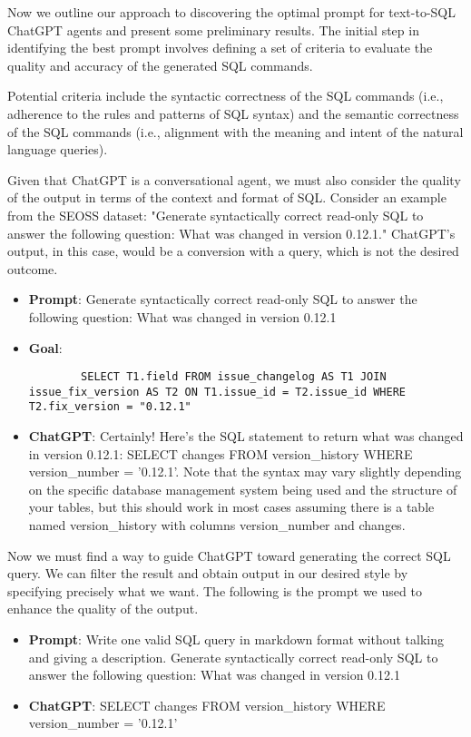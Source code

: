 Now we outline our approach to discovering the optimal prompt for text-to-SQL ChatGPT agents and present some preliminary results.
The initial step in identifying the best prompt involves defining a set of criteria to evaluate the quality and accuracy of the generated SQL commands.

Potential criteria include the syntactic correctness of the SQL commands (i.e., adherence to the rules and patterns of SQL syntax) and the semantic correctness of the SQL commands (i.e., alignment with the meaning and intent of the natural language queries).

Given that ChatGPT is a conversational agent, we must also consider the quality of the output in terms of the context and format of SQL.
Consider an example from the SEOSS dataset: "Generate syntactically correct read-only SQL to answer the following question: What was changed in version 0.12.1." ChatGPT's output, in this case, would be a conversion with a query, which is not the desired outcome.

\begin{itemize}
    \item \textbf{Prompt}: Generate syntactically correct read-only SQL to answer the following question: What was changed in version 0.12.1
    \item \textbf{Goal}: \\\begin{lstlisting}
        SELECT T1.field FROM issue_changelog AS T1 JOIN issue_fix_version AS T2 ON T1.issue_id = T2.issue_id WHERE T2.fix_version = "0.12.1"
    \end{lstlisting}
    \item \textbf{ChatGPT}: Certainly! Here's the SQL statement to return what was changed in version 0.12.1:
          SELECT changes FROM version\_history WHERE version\_number = '0.12.1'. Note that the syntax may vary slightly depending on the specific database management system being used and the structure of your tables, but this should work in most cases assuming there is a table named version\_history with columns version\_number and changes.
\end{itemize}

Now we must find a way to guide ChatGPT toward generating the correct SQL query. We can filter the result and obtain output in our desired style by specifying precisely what we want. The following is the prompt we used to enhance the quality of the output.

\begin{itemize}
    \item \textbf{Prompt}: Write one valid SQL query in markdown format without talking and giving a description. Generate syntactically correct read-only SQL to answer the following question: What was changed in version 0.12.1
    \item \textbf{ChatGPT}: SELECT changes FROM version\_history WHERE version\_number = '0.12.1'
\end{itemize}

